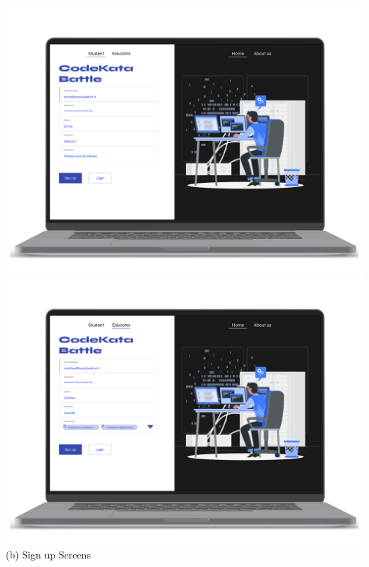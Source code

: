 \begin{center}
    \includegraphics[scale=0.13]{Images/ui-ux/student_signup.png}
    \includegraphics[scale=0.13]{Images/ui-ux/educator_signup.png}
    (b) Sign up Screens
\end{center}
\newpage
